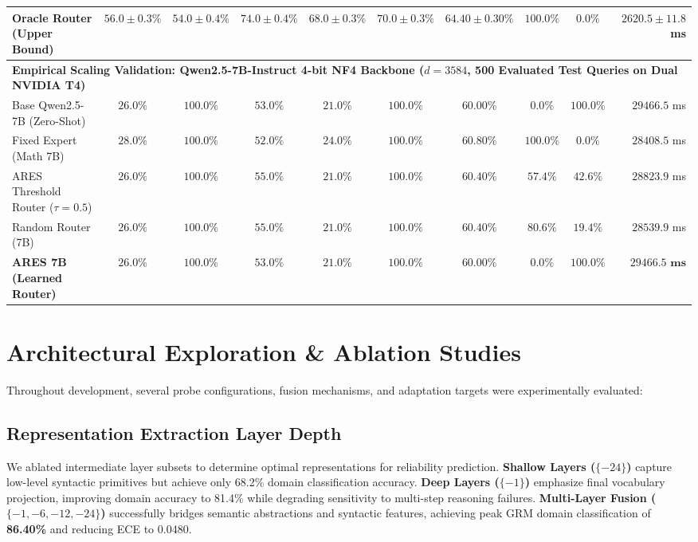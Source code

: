 \documentclass[journal,10pt,twocolumn]{IEEEtran}
\begin{document}
\begin{table}[t]
{\begin{tabular}{lccccccccr}
Oracle Router (Upper Bound) & $56.0 \pm 0.3\%$ & $54.0 \pm 0.4\%$ & $74.0 \pm 0.4\%$ & $68.0 \pm 0.3\%$ & $70.0 \pm 0.3\%$ & $64.40 \pm 0.30\%$ & $100.0\%$ & $0.0\%$ & $2620.5 \pm 11.8$ ms \\
\midrule
\multicolumn{10}{l}{\textbf{Empirical Scaling Validation: Qwen2.5-7B-Instruct 4-bit NF4 Backbone ($d=3584$, 500 Evaluated Test Queries on Dual NVIDIA T4)}} \\
\midrule
Base Qwen2.5-7B (Zero-Shot)         & $26.0\%$ & $100.0\%$ & $53.0\%$ & $21.0\%$ & $100.0\%$ & $60.00\%$ &   $0.0\%$ & $100.0\%$ & $29466.5$ ms \\
Fixed Expert (Math 7B)              & $28.0\%$ & $100.0\%$ & $52.0\%$ & $24.0\%$ & $100.0\%$ & $60.80\%$ & $100.0\%$ &   $0.0\%$ & $28408.5$ ms \\
ARES Threshold Router ($\tau=0.5$)  & $26.0\%$ & $100.0\%$ & $55.0\%$ & $21.0\%$ & $100.0\%$ & $60.40\%$ &  $57.4\%$ &  $42.6\%$ & $28823.9$ ms \\
Random Router (7B)                  & $26.0\%$ & $100.0\%$ & $55.0\%$ & $21.0\%$ & $100.0\%$ & $60.40\%$ &  $80.6\%$ &  $19.4\%$ & $28539.9$ ms \\
\textbf{ARES 7B (Learned Router)}   & $\mathbf{26.0\%}$ & $\mathbf{100.0\%}$ & $\mathbf{53.0\%}$ & $\mathbf{21.0\%}$ & $\mathbf{100.0\%}$ & $\mathbf{60.00\%}$ &   $\mathbf{0.0\%}$ & $\mathbf{100.0\%}$ & $\mathbf{29466.5\text{ ms}}$ \\
\bottomrule
\end{tabular}%
}
\end{table}

\section{Architectural Exploration \& Ablation Studies}

Throughout development, several probe configurations, fusion mechanisms, and adaptation targets were experimentally evaluated:

\subsection{Representation Extraction Layer Depth}
We ablated intermediate layer subsets to determine optimal representations for reliability prediction. \textbf{Shallow Layers ($\{-24\}$)} capture low-level syntactic primitives but achieve only 68.2\% domain classification accuracy. \textbf{Deep Layers ($\{-1\}$)} emphasize final vocabulary projection, improving domain accuracy to 81.4\% while degrading sensitivity to multi-step reasoning failures. \textbf{Multi-Layer Fusion ($\{-1, -6, -12, -24\}$)} successfully bridges semantic abstractions and syntactic features, achieving peak GRM domain classification of \textbf{86.40\%} and reducing ECE to 0.0480.
\end{document}
